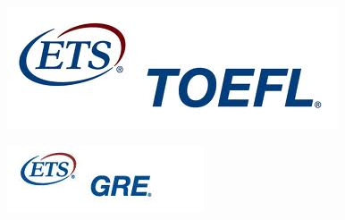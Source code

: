 \documentclass[10pt]{beamer}
\begin{document}
\begin{frame}
\begin{columns}[t]
\begin{figure}[h]
			  \includegraphics[scale=0.3]{figures/TOEFL_Logo.jpg} 
	          \label{fig:TOEFLLogo}             

	          \includegraphics[scale=0.6]{figures/GRE_Logo.jpg} 	
	          \label{fig:GRELogo}

            \label{fig:Requirements}
	\end{figure} 

\end{columns}

\end{frame}
\end{document}
